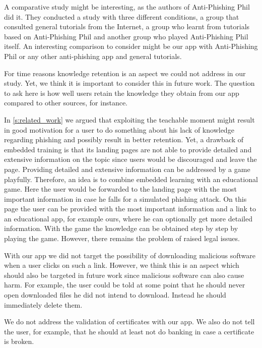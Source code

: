 \begin{description}[leftmargin=0cm]
	\item[Comparative Study] A comparative study might be interesting, as the authors of Anti-Phishing Phil~\cite{sheng2007antiphishingphil} did it.
	They conducted a study with three different conditions,  a group that consulted general tutorials from the Internet, a  group who learnt from tutorials based on Anti-Phishing Phil and another group who played Anti-Phishing Phil itself.
	An interesting comparison to consider might be our app with Anti-Phishing Phil or any other anti-phishing app and general tutorials.
	\item[Study on Retention] For time reasons knowledge retention is an aspect we could not address in our study.
	Yet, we think it is important to consider this in future work.
	The question to ask here is how well users retain the knowledge they obtain from our app compared to other sources, for instance.
	\item[Embedded Training] In \autoref{s:related_work} we argued that exploiting the teachable moment might result in good motivation for a user to do something about his lack of knowledge regarding phishing and possibly result in better retention.
	Yet, a drawback of embedded training is that its landing pages are not able to provide detailed and extensive information on the topic since users would be discouraged and leave the page.
	Providing detailed and extensive information can be addressed by a game playfully.
	Therefore, an idea is to combine embedded learning with an educational game.
	Here the user would be forwarded to the landing page with the most important information in case he falls for a simulated phishing attack.
	On this page the user can be provided with the most important information and a link to an educational app, for example ours, where he can optionally get more detailed information.
	With the game the knowledge can be obtained step by step by playing the game.
However, there remains the problem of raised legal issues.
	\item[Malicious Downloads] With our app we did not target the possibility of downloading malicious software when a user clicks on such a link.
	However, we think this is an aspect which should also be targeted in future work since malicious software can also cause harm.
	For example, the user could be told at some point that he should never open downloaded files he did not intend to download.
	Instead he should immediately delete them.
	\item[Certificate Validation] We do not address the validation of certificates with our app. We also do not tell the user, for example, that he should at least not do banking in case a certificate is broken.

\end{description}
